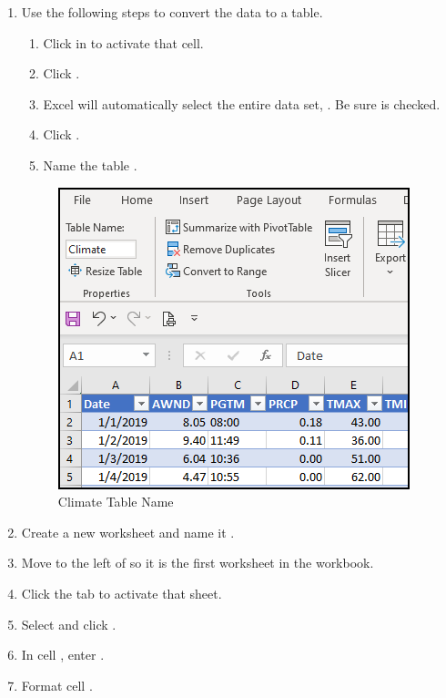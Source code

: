 \begin{enumerate}[resume]
\begin{enumerate}
		
	\end{enumerate}
	
	\item Use the following steps to convert the data to a table.
	
	\begin{enumerate}
		\item Click in  to activate that cell.
		\item Click .
		\item Excel will automatically select the entire data set, . Be sure  is checked.
		\item Click .
		\item Name the table .
	\end{enumerate}
	
	\begin{figure}[H]
		\centering
		\includegraphics[width=\maxwidth{.75\linewidth}]{gfx/ch09_fig85}
		\caption{Climate Table Name}
		\label{09:fig85}
	\end{figure}
	
	\item Create a new worksheet and name it .
	\item Move  to the left of  so it is the first worksheet in the workbook.
	\item Click the  tab to activate that sheet.
	\item Select  and click .
	\item In cell , enter .
	\item Format cell .
	

\end{enumerate}
